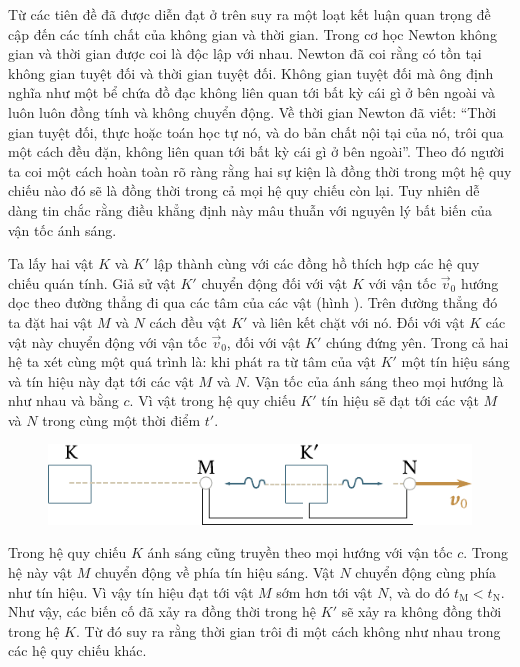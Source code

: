 Từ các tiên đề đã được diễn đạt ở trên suy ra một loạt kết luận quan trọng đề cập đến các tính chất của không gian và thời gian. Trong cơ học Newton không gian và thời gian được coi là độc lập với nhau. Newton đã coi rằng có tồn tại không gian tuyệt đối và thời gian tuyệt đối. Không gian tuyệt đối mà ông định nghĩa như một bể chứa đồ đạc không liên quan tới bất kỳ cái gì ở bên ngoài và luôn luôn đồng tính và không chuyển động. Về thời gian Newton đã viết: ``Thời gian tuyệt đối, thực hoặc toán học tự nó, và do bản chất nội tại của nó, trôi qua một cách đều đặn, không liên quan tới bất kỳ cái gì ở bên ngoài''. Theo đó người ta coi một cách hoàn toàn rõ ràng rằng hai sự kiện là đồng thời trong một hệ quy chiếu nào đó sẽ là đồng thời trong cả mọi hệ quy chiếu còn lại. Tuy nhiên dễ dàng tin chắc rằng điều khẳng định này mâu thuẫn với nguyên lý bất biến của vận tốc ánh sáng.

Ta lấy hai vật $K$ và $K'$ lập thành cùng với các đồng hồ thích hợp các hệ quy chiếu quán tính. Giả sử vật $K'$ chuyển động đối với vật $K$ với vận tốc $\vec{v}_0$ hướng dọc theo đường thẳng đi qua các tâm của các vật (hình ). Trên đường thẳng đó ta đặt hai vật $M$ và $N$ cách đều vật $K'$ và liên kết chặt với nó. Đối với vật $K$ các vật này chuyển động với vận tốc $\vec{v}_0$, đối với vật $K'$ chúng đứng yên. Trong cả hai hệ ta xét cùng một quá trình là: khi phát ra từ tâm của vật $K'$ một tín hiệu sáng và tín hiệu này đạt tới các vật $M$ và $N$. Vận tốc của ánh sáng theo mọi hướng là như nhau và bằng $c$. Vì vật trong hệ quy chiếu $K'$ tín hiệu sẽ đạt tới các vật $M$ và $N$ trong cùng một thời điểm $t'$.

\begin{figure}[!htb]
	\begin{center}
		\includegraphics[scale=0.95]{figures/ch_08/fig_8_1.pdf}
		\caption[]{}
		\label{fig:8_1}
	\end{center}
\end{figure}

Trong hệ quy chiếu $K$ ánh sáng cũng truyền theo mọi hướng với vận tốc $c$. Trong hệ này vật $M$ chuyển động về phía tín hiệu sáng. Vật $N$ chuyển động cùng phía như tín hiệu.  Vì vậy tín hiệu đạt tới vật $M$ sớm hơn tới vật $N$, và do đó $t_{\text{M}}<t_{\text{N}}$. Như vậy, các biến cố đã xảy ra đồng thời trong hệ $K'$ sẽ xảy ra không đồng thời trong hệ $K$. Từ đó suy ra rằng thời gian trôi đi một cách không như nhau trong các hệ quy chiếu khác.

